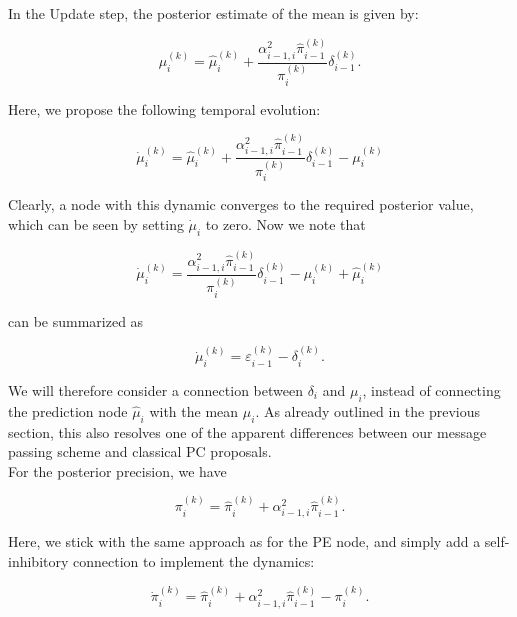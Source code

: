In the \textsf{Update} step, the posterior estimate of the mean is given by:

\begin{equation}
	\mu_i^{(k)} = \hat{\mu}_i^{(k)} + \frac{\alpha_{i-1,i}^2 \hat{\pi}_{i-1}^{(k)}}{\pi_i^{(k)}} \delta_{i-1}^{(k)}.
\end{equation}

Here, we propose the following temporal evolution:

\begin{equation}
	\dot{\mu}_i^{(k)} = \hat{\mu}_i^{(k)} + \frac{\alpha_{i-1,i}^2 \hat{\pi}_{i-1}^{(k)}}{\pi_i^{(k)}} \delta_{i-1}^{(k)} - \mu_i^{(k)}
\end{equation}

Clearly, a node with this dynamic converges to the required posterior value, which can be seen by setting $\dot{\mu}_i$ to zero. Now we note that

\begin{equation}
	\dot{\mu}_i^{(k)} = \frac{\alpha_{i-1,i}^2 \hat{\pi}_{i-1}^{(k)}}{\pi_i^{(k)}} \delta_{i-1}^{(k)} - \mu_i^{(k)} + \hat{\mu}_i^{(k)}
\end{equation}

can be summarized as 

\begin{equation}
	\dot{\mu}_i^{(k)} = \varepsilon_{i-1}^{(k)} - \delta_i^{(k)}.
\end{equation}

We will therefore consider a connection between $\delta_i$ and $\mu_i$, instead of connecting the prediction node $\hat{\mu}_i$ with the mean $\mu_i$. As already outlined in the previous section, this also resolves one of the apparent differences between our message passing scheme and classical PC proposals.\\

For the posterior precision, we have

\begin{equation}
	\pi_i^{(k)} = \hat{\pi}_i^{(k)} + \alpha_{i-1,i}^2 \hat{\pi}_{i-1}^{(k)}.
\end{equation}

Here, we stick with the same approach as for the \textsf{PE} node, and simply add a self-inhibitory connection to implement the dynamics:

\begin{equation}
	\dot{\pi}_i^{(k)} = \hat{\pi}_i^{(k)} + \alpha_{i-1,i}^2 \hat{\pi}_{i-1}^{(k)} - \pi_i^{(k)}.
\end{equation}

